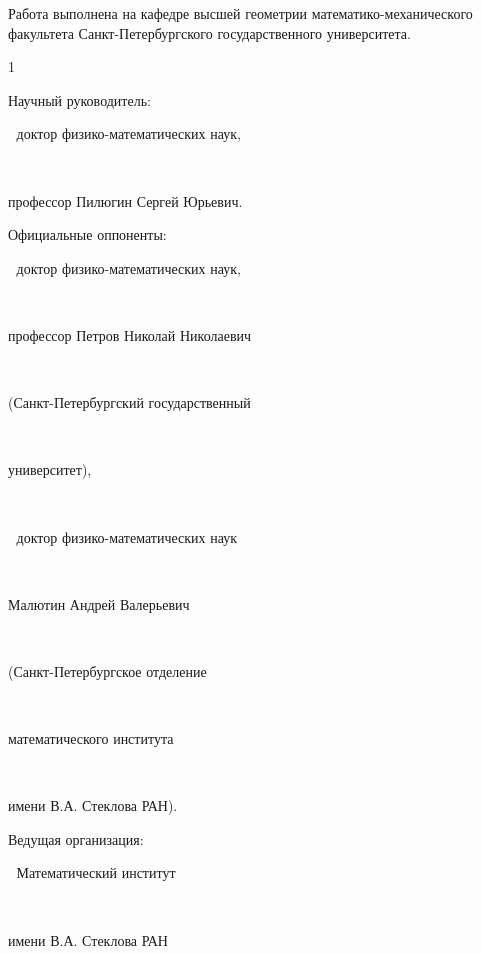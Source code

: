 
\thispagestyle{empty} \noindent Работа выполнена на кафедре
высшей геометрии ма\-те\-ма\-ти\-ко-механи\-ческого
факультета Санкт-Петербургского государственного университета.

\begin{spacing}{1}

\bigskip
\bigskip

\noindent
\parbox{65mm}{Научный руководитель:} $\;$ доктор физико-математических наук,\newline\noindent%
\parbox{70mm}{ \hphantom{Q}\  }профессор Пилюгин Сергей Юрьевич.\medskip\newline\noindent%
\parbox{65mm}{Официальные оппоненты:} $\;$ доктор физико-математических наук,\newline\noindent%
\parbox{70mm}{ \hphantom{Q}\  }профессор Петров Николай Николаевич\newline\noindent%
\parbox{70mm}{ \hphantom{Q}\  }(Санкт-Петербургский государственный \newline\noindent%
\parbox{70mm}{ \hphantom{Q}\  }университет),\medskip\newline\noindent%
\parbox{65mm}{ \hphantom{Q}\  } $\;$ доктор физико-математических наук\newline\noindent%
\parbox{70mm}{ \hphantom{Q}\  }Малютин Андрей Валерьевич\newline\noindent%
\parbox{70mm}{ \hphantom{Q}\  }(Санкт-Петербургское отделение\newline\noindent%
\parbox{70mm}{ \hphantom{Q}\  }математического института\newline\noindent%
\parbox{70mm}{ \hphantom{Q}\  }имени В.А. Стеклова РАН).\medskip\newline\newline\noindent%
\parbox{65mm}{Ведущая организация:} $\;$ Математический институт \newline\noindent%
\parbox{70mm}{ \hphantom{Q}\  }имени В.А. Стеклова РАН \newline\noindent%


\end{spacing}
